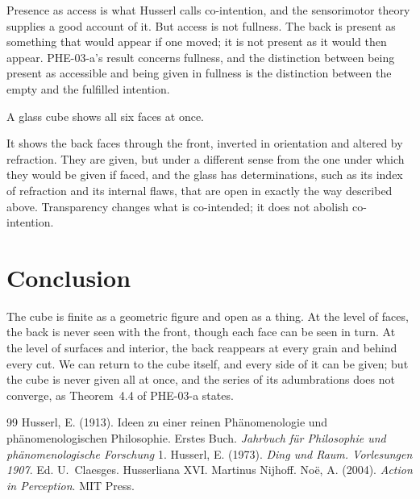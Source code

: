 \documentclass{situationist-preprint}
\begin{document}
\begin{reply}
Presence as access is what Husserl calls co-intention, and the sensorimotor theory supplies a good account of it. But access is not fullness. The back is present as something that would appear if one moved; it is not present as it would then appear. PHE-03-a's result concerns fullness, and the distinction between being present as accessible and being given in fullness is the distinction between the empty and the fulfilled intention.
\end{reply}

\begin{objection}
A glass cube shows all six faces at once.
\end{objection}

\begin{reply}
It shows the back faces through the front, inverted in orientation and altered by refraction. They are given, but under a different sense from the one under which they would be given if faced, and the glass has determinations, such as its index of refraction and its internal flaws, that are open in exactly the way described above. Transparency changes what is co-intended; it does not abolish co-intention.
\end{reply}

\section{Conclusion}

The cube is finite as a geometric figure and open as a thing. At the level of faces, the back is never seen with the front, though each face can be seen in turn. At the level of surfaces and interior, the back reappears at every grain and behind every cut. We can return to the cube itself, and every side of it can be given; but the cube is never given all at once, and the series of its adumbrations does not converge, as Theorem~4.4 of PHE-03-a states.

\begin{thebibliography}{99}\small
{} Husserl, E. (1913). Ideen zu einer reinen Phänomenologie und phänomenologischen Philosophie. Erstes Buch. \emph{Jahrbuch für Philosophie und phänomenologische Forschung} 1.
 Husserl, E. (1973). \emph{Ding und Raum. Vorlesungen 1907}. Ed. U.~Claesges. Husserliana XVI. Martinus Nijhoff.
 No\"e, A. (2004). \emph{Action in Perception}. MIT Press.
\end{thebibliography}
\end{document}

